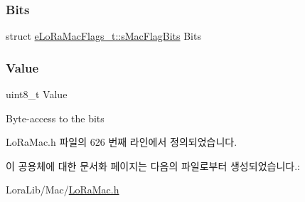 \subsubsection{\texorpdfstring{Bits}{Bits}}
{\footnotesize\ttfamily struct \mbox{\hyperlink{structe_lo_ra_mac_flags__t_1_1s_mac_flag_bits}{e\+Lo\+Ra\+Mac\+Flags\+\_\+t\+::s\+Mac\+Flag\+Bits}} Bits}

\mbox{\label{unione_lo_ra_mac_flags__t_a88f4d00bdab99ae6f48c7ae0bc468bb4}} 
\subsubsection{\texorpdfstring{Value}{Value}}
{\footnotesize\ttfamily uint8\+\_\+t Value}

Byte-\/access to the bits 

Lo\+Ra\+Mac.\+h 파일의 626 번째 라인에서 정의되었습니다.



이 공용체에 대한 문서화 페이지는 다음의 파일로부터 생성되었습니다.\+:\begin{DoxyCompactItemize}
\item 
Lora\+Lib/\+Mac/\mbox{\hyperlink{_lo_ra_mac_8h}{Lo\+Ra\+Mac.\+h}}\end{DoxyCompactItemize}
